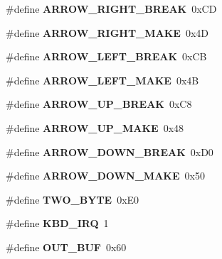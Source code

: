 \begin{DoxyCompactItemize}
\item 
\mbox{\label{group__KBD_gabea786f920df258fed3d7753f93723f2}} 
\#define {\bfseries A\+R\+R\+O\+W\+\_\+\+R\+I\+G\+H\+T\+\_\+\+B\+R\+E\+AK}~0x\+CD
\item 
\mbox{\label{group__KBD_ga3f425488594d3efad8ee32f354545ca1}} 
\#define {\bfseries A\+R\+R\+O\+W\+\_\+\+R\+I\+G\+H\+T\+\_\+\+M\+A\+KE}~0x4D
\item 
\mbox{\label{group__KBD_ga4b61ad8be3f895165133c0afbe12ae41}} 
\#define {\bfseries A\+R\+R\+O\+W\+\_\+\+L\+E\+F\+T\+\_\+\+B\+R\+E\+AK}~0x\+CB
\item 
\mbox{\label{group__KBD_ga1f23aef94d6ef456f0cf17d0d27a1dbc}} 
\#define {\bfseries A\+R\+R\+O\+W\+\_\+\+L\+E\+F\+T\+\_\+\+M\+A\+KE}~0x4B
\item 
\mbox{\label{group__KBD_ga8f433016b605c6935f765e7d874f181c}} 
\#define {\bfseries A\+R\+R\+O\+W\+\_\+\+U\+P\+\_\+\+B\+R\+E\+AK}~0x\+C8
\item 
\mbox{\label{group__KBD_gaa0b777d407a1c7c77e276c2161addf1f}} 
\#define {\bfseries A\+R\+R\+O\+W\+\_\+\+U\+P\+\_\+\+M\+A\+KE}~0x48
\item 
\mbox{\label{group__KBD_ga09ad527a9a4f6a34059fe4652bc0924b}} 
\#define {\bfseries A\+R\+R\+O\+W\+\_\+\+D\+O\+W\+N\+\_\+\+B\+R\+E\+AK}~0x\+D0
\item 
\mbox{\label{group__KBD_gaca2dee6f73d0d04b8b491f26d2b94bbd}} 
\#define {\bfseries A\+R\+R\+O\+W\+\_\+\+D\+O\+W\+N\+\_\+\+M\+A\+KE}~0x50
\item 
\mbox{\label{group__KBD_ga7f9aacad98586d9a60c8d16b6f5435f4}} 
\#define {\bfseries T\+W\+O\+\_\+\+B\+Y\+TE}~0x\+E0
\item 
\mbox{\label{group__KBD_ga5c1072213ce8d8cd43628c4319ae0391}} 
\#define {\bfseries K\+B\+D\+\_\+\+I\+RQ}~1
\item 
\mbox{\label{group__KBD_gacfb42dde389e8ca36ab267002fbf5c6a}} 
\#define {\bfseries O\+U\+T\+\_\+\+B\+UF}~0x60
\item 

\end{DoxyCompactItemize}
